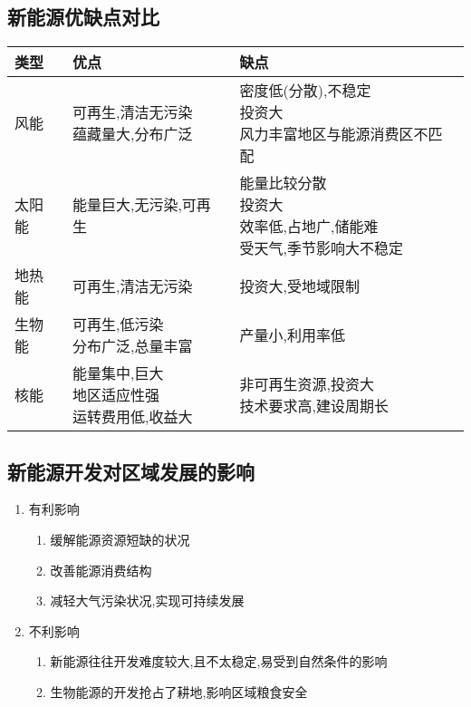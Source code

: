 \documentclass[a4paper]{article}
\begin{document}
    \subsection{新能源优缺点对比} %
        \begin{tabular}{|l|l|l|}
            \hline
            类型 & 优点 & 缺点 \\
            \hline
            风能 & \makecell[l]{可再生,清洁无污染 \\ 蕴藏量大,分布广泛} & \makecell[l]{密度低(分散),不稳定 \\ 投资大 \\ 风力丰富地区与能源消费区不匹配} \\
            \hline
            太阳能 & 能量巨大,无污染,可再生 & \makecell[l]{能量比较分散 \\ 投资大 \\ 效率低,占地广,储能难 \\ 受天气,季节影响大不稳定} \\
            \hline
            地热能 & 可再生,清洁无污染 & 投资大,受地域限制 \\
            \hline
            生物能 & \makecell[l]{可再生,低污染 \\ 分布广泛,总量丰富} & 产量小,利用率低 \\
            \hline
            核能 & \makecell[l]{能量集中,巨大 \\ 地区适应性强 \\ 运转费用低,收益大} & \makecell[l]{非可再生资源,投资大 \\ 技术要求高,建设周期长} \\
            \hline
        \end{tabular}
    \subsection{新能源开发对区域发展的影响}
    \begin{enumerate}
        \item 有利影响
        \begin{enumerate}
            \item 缓解能源资源短缺的状况
            \item 改善能源消费结构
            \item 减轻大气污染状况,实现可持续发展
        \end{enumerate}
        \item 不利影响
        \begin{enumerate}
            \item 新能源往往开发难度较大,且不太稳定,易受到自然条件的影响
            \item 生物能源的开发抢占了耕地,影响区域粮食安全
        \end{enumerate}
    \end{enumerate}
\end{document}
